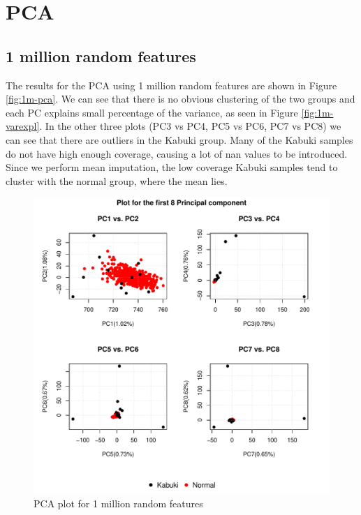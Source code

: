 \section{PCA}
\label{section:results:PCA}
\subsection{1 million random features}
The results for the PCA using 1 million random features are shown in Figure \ref{fig:1m-pca}. We can see that there is no obvious clustering of the two groups and each PC explains small percentage of the variance, as seen in Figure \ref{fig:1m-varexpl}. In the other three plots (PC3 vs PC4, PC5 vs PC6, PC7 vs PC8) we can see that there are outliers in the Kabuki group. Many of the Kabuki samples do not have high enough coverage, causing a lot of nan values to be introduced. Since we perform mean imputation, the low coverage Kabuki samples tend to cluster with the normal group, where the mean lies. 

\FloatBarrier
\begin{figure}[!h]
    \centering
    \includegraphics[width=\textwidth]{figures/PCA/1m/pca_plot.pdf}
    \caption{PCA plot for 1 million random features}
    \label{fig:1m-PCA}
\end{figure}

